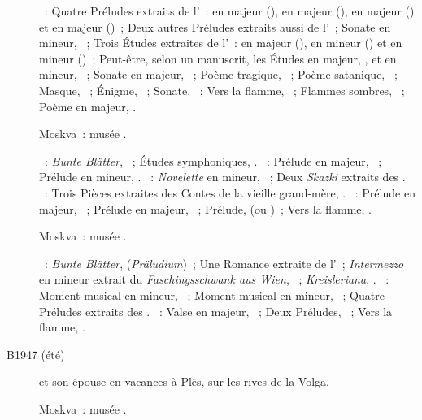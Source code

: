 \begin{description}
 \textsc{\Scriabine{}}~: Quatre Préludes extraits de l'~: en \kB
 majeur (), en \kG \Flat majeur (), en \kD \Flat
 majeur () et en \kA \Flat majeur ()~; Deux autres
 Préludes extraits aussi de l'~; Sonate en \kF \Sharp mineur,
 ~; Trois Études extraites de l'~: en \kB majeur
 (), en \kB \Flat mineur () et en \kG \Sharp mineur
 ()~; Peut-être, selon un manuscrit, les Études en \kA \Flat
 majeur,  , et en \kD \Sharp mineur, 
 ~; Sonate en \kF \Sharp majeur, ~; Poème tragique,
 ~; Poème satanique, ~; Masque,  ~;
 Énigme,  ~; Sonate, ~; Vers la flamme,
 ~; Flammes sombres,  ~; Poème en \kF \Sharp
 majeur,  .
 \item[\DateWithWeekDay{1947-06-18}]
 Moskva~: musée \Scriabine{}.

 \textsc{\Schumann{}}~: \emph{Bunte Blätter}, ~; Études
 symphoniques, .
 \textsc{\Rachmaninov{}}~: Prélude en \kD majeur,  ~;
 Prélude en \kC mineur,  .
 \textsc{\Medtner{}}~: \emph{Novelette} en \kC mineur, 
 ~; Deux \emph{Skazki} extraits des .
 \textsc{\Prokofiev{}}~: Trois Pièces extraites des Contes de la vieille
 grand-mère, .
 \textsc{\Scriabine{}}~: Prélude en \kF \Sharp majeur, 
 ~; Prélude en \kF \Sharp majeur,  ~; Prélude,
   (ou )~; Vers la flamme, .
 \item[\DateWithWeekDay{1947-07-10}]
 Moskva~: musée \Scriabine{}.

 \textsc{\Schumann{}}~: \emph{Bunte Blätter},  
 (\emph{Präludium})~; Une Romance extraite de l'~;
 \emph{Intermezzo} en \kE \Flat mineur extrait du \emph{Faschingsschwank aus
 Wien},  ~; \emph{Kreisleriana}, .
 \textsc{\Rachmaninov{}}~: Moment musical en \kE \Flat mineur, 
 ~; Moment musical en \kB mineur,  ~; Quatre
 Préludes extraits des .
 \textsc{\Scriabine{}}~: Valse en \kA \Flat majeur, ~; Deux
 Préludes, ~; Vers la flamme, .
 \item[B1947 (été)]
 \VSofronitsky{} et son épouse \VDushinova{} en vacances à Plës, sur les
 rives de la Volga.
 \item[\DateWithWeekDay{1947-10-19}]
 Moskva~: musée \Scriabine{}.


\end{description}
